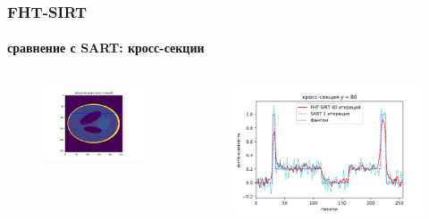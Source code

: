 \documentclass[12pt]{beamer}
\begin{document}
\begin{frame}
\frametitle{FHT-SIRT}
\framesubtitle{сравнение с SART: кросс-секции}
\begin{columns}[T,onlytextwidth]
  \hspace*{-1cm}
  \begin{column}{0.2\textwidth}
    \begin{figure}
      \centering
      \vspace{1.5cm}
      \includegraphics[width=1.5\textwidth]{cs_viz}
    \end{figure}
  \end{column}
  \begin{column}{0.8\textwidth}
    \begin{figure}
      \centering
      \vspace{-1cm}
      \includegraphics[width=1.2\textwidth]{cs_80}
    \end{figure}
  \end{column}
\end{columns}
\end{frame}
\end{document}
